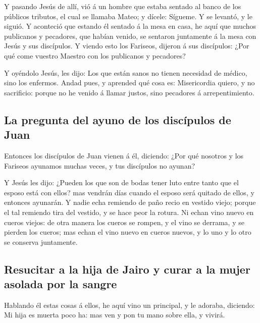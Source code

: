  Y pasando Jesús de allí, vió á un hombre que estaba
sentado al banco de los públicos tributos, el cual se llamaba Mateo; y
dícele: Sígueme. Y se levantó, y le siguió.  Y aconteció
que estando él sentado á la mesa en casa, he aquí que muchos publicanos
y pecadores, que habían venido, se sentaron juntamente á la mesa con
Jesús y sus discípulos.  Y viendo esto los Fariseos,
dijeron á sus discípulos: ¿Por qué come vuestro Maestro con los
publicanos y pecadores?

 Y oyéndolo Jesús, les dijo: Los que están sanos no
tienen necesidad de médico, sino los enfermos.  Andad
pues, y aprended qué cosa es: Misericordia quiero, y no sacrificio:
porque no he venido á llamar justos, sino pecadores á arrepentimiento.

\hypertarget{la-pregunta-del-ayuno-de-los-discuxedpulos-de-juan}{%
\subsection{La pregunta del ayuno de los discípulos de
Juan}\label{la-pregunta-del-ayuno-de-los-discuxedpulos-de-juan}}

 Entonces los discípulos de Juan vienen á él, diciendo:
¿Por qué nosotros y los Fariseos ayunamos muchas veces, y tus discípulos
no ayunan?

 Y Jesús les dijo: ¿Pueden los que son de bodas tener
luto entre tanto que el esposo está con ellos? mas vendrán días cuando
el esposo será quitado de ellos, y entonces ayunarán.  Y
nadie echa remiendo de paño recio en vestido viejo; porque el tal
remiendo tira del vestido, y se hace peor la rotura.  Ni
echan vino nuevo en cueros viejos: de otra manera los cueros se rompen,
y el vino se derrama, y se pierden los cueros; mas echan el vino nuevo
en cueros nuevos, y lo uno y lo otro se conserva juntamente.

\hypertarget{resucitar-a-la-hija-de-jairo-y-curar-a-la-mujer-asolada-por-la-sangre}{%
\subsection{Resucitar a la hija de Jairo y curar a la mujer asolada por
la
sangre}\label{resucitar-a-la-hija-de-jairo-y-curar-a-la-mujer-asolada-por-la-sangre}}

 Hablando él estas cosas á ellos, he aquí vino un
principal, y le adoraba, diciendo: Mi hija es muerta poco ha: mas ven y
pon tu mano sobre ella, y vivirá.

